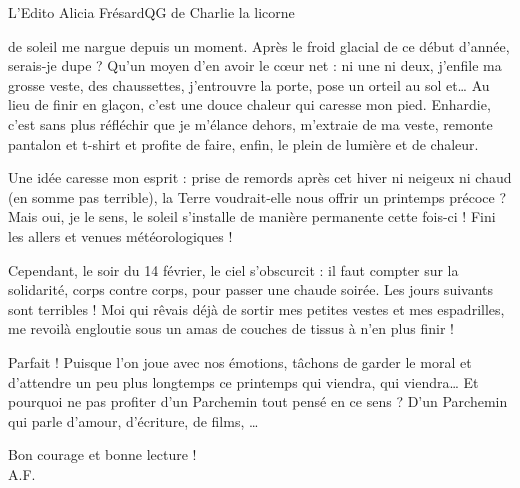 \newpage
\restoregeometry


\vspace*{-1.9cm}
\begin{article}{L'Edito}
{Alicia Frésard}{QG de Charlie la licorne}

\begin{spacing}{.9}
 de soleil me nargue depuis un moment. Après le froid glacial de ce début d’année, serais-je dupe ? Qu’un moyen d’en avoir le cœur net : ni une ni deux, j’enfile ma grosse veste, des chaussettes, j’entrouvre la porte, pose un orteil au sol et… Au lieu de finir en glaçon, c’est une douce chaleur qui caresse mon pied. Enhardie, c’est sans plus réfléchir que je m’élance dehors, m’extraie de ma veste, remonte pantalon et t-shirt et profite de faire, enfin, le plein de lumière et de chaleur.

Une idée caresse mon esprit : prise de remords après cet hiver ni neigeux ni chaud (en somme pas terrible), la Terre voudrait-elle nous offrir un printemps précoce ? Mais oui, je le sens, le soleil s’installe de manière permanente cette fois-ci ! Fini les allers et venues météorologiques !

Cependant, le soir du 14 février, le ciel s’obscurcit : il faut compter sur la solidarité, corps contre corps, pour passer une chaude soirée. Les jours suivants sont terribles ! Moi qui rêvais déjà de sortir mes petites vestes et mes espadrilles, me revoilà engloutie sous un amas de couches de tissus à n’en plus finir !

Parfait ! Puisque l’on joue avec nos émotions, tâchons de garder le moral et d’attendre un peu plus longtemps ce printemps qui viendra, qui viendra… Et pourquoi ne pas profiter d’un Parchemin tout pensé en ce sens ? D’un Parchemin qui parle d’amour, d’écriture, de films, … 

Bon courage et bonne lecture !\\
A.F.
\end{spacing}
\end{article}


\vspace*{-2mm}\ligne\vspace*{-4mm}


